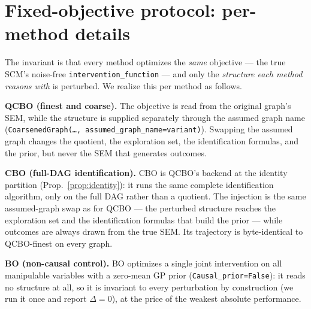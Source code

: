 \documentclass[twoside]{article}
\newcommand{\QCBO}{\textsc{QCBO}}
\newcommand{\CBO}{\textsc{CBO}}
\newcommand{\BO}{\textsc{BO}}
\begin{document}
\section{Fixed-objective protocol: per-method details}\label{app:seam}
The invariant is that every method optimizes the \emph{same} objective --- the true
SCM's noise-free \texttt{intervention\_function} --- and only the \emph{structure each
method reasons with} is perturbed. We realize this per method as follows.

\textbf{\QCBO{} (finest and coarse).} The objective is read from the original graph's
SEM, while the structure is supplied separately through the assumed graph name
(\texttt{CoarsenedGraph(\ldots, assumed\_graph\_name=variant)}). Swapping the assumed
graph changes the quotient, the exploration set, the identification formulas, and the
prior, but never the SEM that generates outcomes.

\textbf{\CBO{} (full-DAG identification).} \CBO{} is \QCBO{}'s backend at the
identity partition (Prop.~\ref{prop:identity}): it runs the same complete
identification algorithm, only on the full DAG rather than a quotient. The
injection is the same assumed-graph swap as for \QCBO{} --- the perturbed
structure reaches the exploration set and the identification formulas that build
the prior --- while outcomes are always drawn from the true SEM. Its trajectory
is byte-identical to \QCBO{}-finest on every graph.

\textbf{\BO{} (non-causal control).} \BO{} optimizes a single joint intervention
on all manipulable variables with a zero-mean GP prior
(\texttt{Causal\_prior=False}): it reads no structure at all, so it
is invariant to every perturbation by construction (we run it once and report
$\Delta=0$), at the price of the weakest absolute performance.
\end{document}
